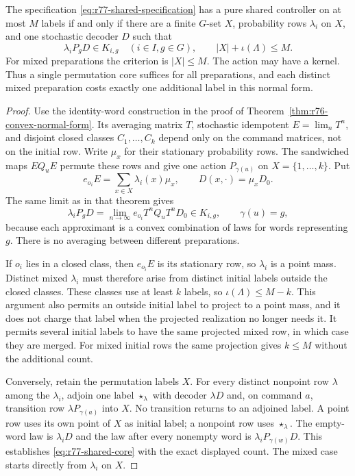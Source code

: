 \begin{theorem}
\label{thm:r77-shared-normal-form}
The specification \eqref{eq:r77-shared-specification} has a pure shared
controller on at most $M$ labels if and only if there are a finite
$G$-set $X$, probability rows $\lambda_i$ on $X$, and one stochastic
decoder $D$ such that
\begin{equation}\label{eq:r77-shared-core}
 \lambda_iP_gD\in K_{i,g}\quad(i\in I,g\in G),
 \qquad |X|+\iota(\Lambda)\le M.
\end{equation}
For mixed preparations the criterion is $|X|\le M$.  The action may have
a kernel.  Thus a single permutation core suffices for all preparations,
and each distinct mixed preparation costs exactly one additional label
in this normal form.
\end{theorem}
\begin{proof}
Use the identity-word construction in the proof of
Theorem~\ref{thm:r76-convex-normal-form}.  Its averaging matrix $T$,
stochastic idempotent $E=\lim_nT^n$, and disjoint closed classes
$C_1,\ldots,C_k$ depend only on the command matrices, not on the initial
row.  Write $\mu_x$ for their stationary probability rows.  The sandwiched
maps $EQ_uE$ permute these rows and give one action $P_{\gamma(u)}$ on
$X=\{1,\ldots,k\}$.  Put
\[
 e_{o_i}E=\sum_{x\in X}\lambda_i(x)\mu_x,
 \qquad D(x,\cdot)=\mu_xD_0.
\]
The same limit as in that theorem gives
\[
 \lambda_iP_gD
   =\lim_{n\to\infty}e_{o_i}T^nQ_uT^nD_0\in K_{i,g},
 \qquad \gamma(u)=g,
\]
because each approximant is a convex combination of laws for words
representing $g$.  There is no averaging between different preparations.

If $o_i$ lies in a closed class, then $e_{o_i}E$ is its stationary row,
so $\lambda_i$ is a point mass.  Distinct mixed $\lambda_i$ must therefore
arise from distinct initial labels outside the closed classes.  These
classes use at least $k$ labels, so
$\iota(\Lambda)\le M-k$.  This argument also permits an outside initial
label to project to a point mass, and it does not charge that label when
the projected realization no longer needs it.  It permits several initial
labels to have the same projected mixed row, in which case they are merged.
For mixed initial rows the same projection gives $k\le M$ without the
additional count.

Conversely, retain the permutation labels $X$.  For every distinct
nonpoint row $\lambda$ among the $\lambda_i$, adjoin one label $\star_\lambda$
with decoder $\lambda D$ and, on command $a$, transition row
$\lambda P_{\gamma(a)}$ into $X$.  No transition returns to an adjoined
label.  A point row uses its own point of $X$ as initial label; a nonpoint
row uses $\star_\lambda$.  The empty-word law is $\lambda_iD$ and the law
after every nonempty word is $\lambda_iP_{\gamma(w)}D$.  This establishes
\eqref{eq:r77-shared-core} with the exact displayed count.  The mixed
case starts directly from $\lambda_i$ on $X$.
\end{proof}

